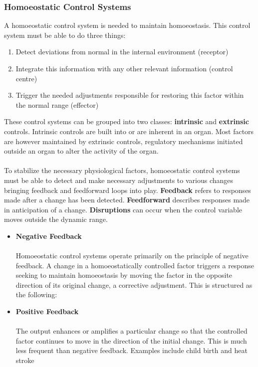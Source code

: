 \documentclass[11pt]{article}
\begin{document}
\subsubsection{Homoeostatic Control Systems}
A homoeostatic control system is needed to maintain homoeostasis. This control system must be able to do three things:
\begin{enumerate}
\item Detect deviations from normal in the internal environment (receptor)
\item Integrate this information with any other relevant information (control centre)
\item Trigger the needed adjustments responsible for restoring this factor within the normal range (effector)
\end{enumerate}
These control systems can be grouped into two classes: \textbf{intrinsic} and \textbf{extrinsic} controls. Intrinsic controls are built into or are inherent in an organ. Most factors are however maintained by extrinsic controls, regulatory mechanisms initiated outside an organ to alter the activity of the organ.
\\ \\
To stabilize the necessary physiological factors, homoeostatic control systems must be able to detect and make necessary adjustments to various changes bringing feedback and feedforward loops into play. \textbf{Feedback} refers to responses made after a change has been detected. \textbf{Feedforward} describes responses made in anticipation of a change. \textbf{Disruptions} can occur when the control variable moves outside the dynamic range.

\begin{itemize}
\item \textbf{Negative Feedback} \\ \\
Homoeostatic control systems operate primarily on the principle of negative feedback. A change in a homoeostatically controlled factor triggers a response seeking to maintain homoeostasis by moving the factor in the opposite direction of its original change, a corrective adjustment. This is structured as the following:

\item \textbf{Positive Feedback} \\ \\
The output enhances or amplifies a particular change so that the controlled factor continues to move in the direction of the initial change. This is much less frequent than negative feedback. Examples include child birth and heat stroke

\end{itemize}
\end{document}
